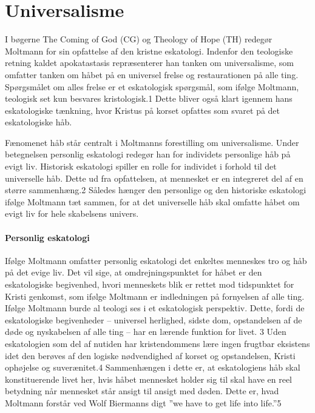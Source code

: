 \chapter{Universalisme}
I bøgerne The Coming of God (CG) og Theology of Hope (TH) redegør Moltmann for sin opfattelse af den kristne eskatologi. Indenfor den teologiske retning kaldet apokatastasis repræsenterer han tanken om universalisme, som omfatter tanken om håbet på en universel frelse og restaurationen på alle ting. Spørgsmålet om alles frelse er et eskatologisk spørgsmål, som ifølge Moltmann, teologisk set kun besvares kristologisk.1 Dette bliver også klart igennem hans eskatologiske tænkning, hvor Kristus på korset opfattes som svaret på det eskatologiske håb.

Fænomenet håb står centralt i Moltmanns forestilling om universalisme. Under betegnelsen personlig eskatologi redegør han for individets personlige håb på evigt liv. Historisk eskatologi spiller en rolle for individet i forhold til det universelle håb. Dette ud fra opfattelsen, at mennesket er en integreret del af en større sammenhæng.2 Således hænger den personlige og den historiske eskatologi ifølge Moltmann tæt sammen, for at det universelle håb skal omfatte håbet om evigt liv for hele skabelsens univers.  

\subsubsection{Personlig eskatologi}
Ifølge Moltmann omfatter personlig eskatologi det enkeltes menneskes tro og håb på det evige liv. Det vil sige, at omdrejningspunktet for håbet er den eskatologiske begivenhed, hvori menneskets blik er rettet mod tidspunktet for Kristi genkomst, som ifølge Moltmann er indledningen på fornyelsen af alle ting. Ifølge Moltmann burde al teologi ses i et eskatologisk perspektiv. Dette, fordi de eskatologiske begivenheder – universel herlighed, sidste dom, opstandelsen af de døde og nyskabelsen af alle ting – har en lærende funktion for livet. 3 Uden eskatologien som del af nutiden har kristendommens lære ingen frugtbar eksistens idet den berøves af den logiske nødvendighed af korset og opstandelsen, Kristi ophøjelse og suverænitet.4 Sammenhængen i dette er, at eskatologiens håb skal konstituerende livet her, hvis håbet mennesket holder sig til skal have en reel betydning når mennesket står ansigt til ansigt med døden. Dette er, hvad Moltmann forstår ved Wolf Biermanns digt ”we have to get life into life.”5

